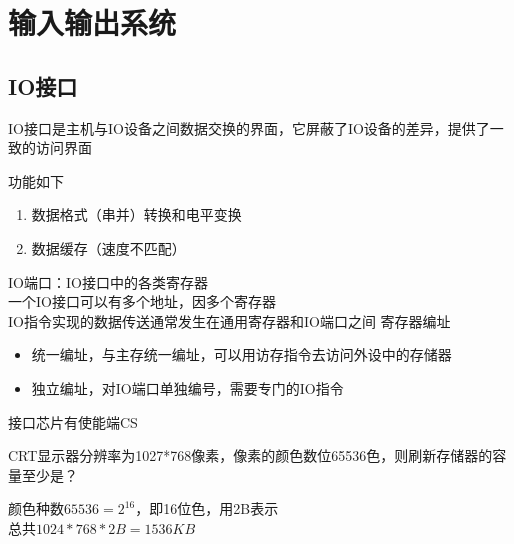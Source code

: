 
\section{输入输出系统}
\subsection{IO接口}
IO接口是主机与IO设备之间数据交换的界面，它屏蔽了IO设备的差异，提供了一致的访问界面
\par 功能如下
\begin{enumerate}
	\item 数据格式（串并）转换和电平变换
	\item 数据缓存（速度不匹配）
\end{enumerate}
IO端口：IO接口中的各类寄存器\\
一个IO接口可以有多个地址，因多个寄存器\\
IO指令实现的数据传送通常发生在通用寄存器和IO端口之间
寄存器编址
\begin{itemize}
	\item 统一编址，与主存统一编址，可以用访存指令去访问外设中的存储器
	\item 独立编址，对IO端口单独编号，需要专门的IO指令
\end{itemize}
接口芯片有使能端CS
\begin{example}
CRT显示器分辨率为1027*768像素，像素的颜色数位65536色，则刷新存储器的容量至少是？
\end{example}
\begin{analysis}
颜色种数$65536=2^{16}$，即16位色，用2B表示\\
总共$1024*768*2B=1536KB$
\end{analysis}

